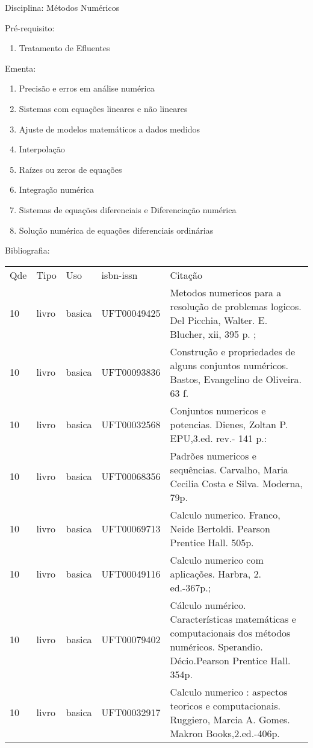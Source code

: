 \documentclass[12pt,a4paper,twoside]{report}
\begin{document}
Disciplina: Métodos Numéricos

Pré-requisito:
\begin{enumerate}
\item Tratamento de Efluentes
\end{enumerate}

Ementa:
\begin{enumerate}
\item Precisão e erros em análise numérica
\item Sistemas com equações lineares e não lineares
\item Ajuste de modelos matemáticos a dados medidos
\item Interpolação
\item Raízes ou zeros de equações
\item Integração numérica
\item Sistemas de equações diferenciais e Diferenciação numérica
\item Solução numérica de equações diferenciais ordinárias
\end{enumerate}

Bibliografia:
\begin{tabular}{lllll}
Qde & Tipo & Uso & isbn-issn & Citação \\
10&livro&basica&UFT00049425&Metodos numericos para a resolução de problemas logicos. Del Picchia, Walter. E. Blucher, xii, 395 p. ;\\
10&livro&basica&UFT00093836&Construção e propriedades de alguns conjuntos numéricos. Bastos, Evangelino de Oliveira. 63 f.\\
10&livro&basica&UFT00032568&Conjuntos numericos e potencias. Dienes, Zoltan P. EPU,3.ed. rev.- 141 p.:\\
10&livro&basica&UFT00068356&Padrões numericos e sequências. Carvalho, Maria Cecilia Costa e Silva. Moderna, 79p.\\
10&livro&basica&UFT00069713&Calculo numerico. Franco, Neide Bertoldi. Pearson Prentice Hall. 505p.\\
10&livro&basica&UFT00049116&Calculo numerico com aplicações. Harbra, 2. ed.-367p.;\\
10&livro&basica&UFT00079402&Cálculo numérico. Características matemáticas e computacionais dos métodos numéricos. Sperandio. Décio.Pearson Prentice Hall. 354p.\\
10&livro&basica&UFT00032917&Calculo numerico : aspectos teoricos e computacionais. Ruggiero, Marcia A. Gomes. Makron Books,2.ed.-406p.\\
\end{tabular}
\end{document}
